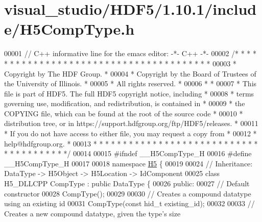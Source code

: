 \hypertarget{visual__studio_2_h_d_f5_21_810_81_2include_2_h5_comp_type_8h_source}{}\section{visual\+\_\+studio/\+H\+D\+F5/1.10.1/include/\+H5\+Comp\+Type.h}
\label{visual__studio_2_h_d_f5_21_810_81_2include_2_h5_comp_type_8h_source}

\begin{DoxyCode}
00001 \textcolor{comment}{// C++ informative line for the emacs editor: -*- C++ -*-}
00002 \textcolor{comment}{/* * * * * * * * * * * * * * * * * * * * * * * * * * * * * * * * * * * * * * *}
00003 \textcolor{comment}{ * Copyright by The HDF Group.                                               *}
00004 \textcolor{comment}{ * Copyright by the Board of Trustees of the University of Illinois.         *}
00005 \textcolor{comment}{ * All rights reserved.                                                      *}
00006 \textcolor{comment}{ *                                                                           *}
00007 \textcolor{comment}{ * This file is part of HDF5.  The full HDF5 copyright notice, including     *}
00008 \textcolor{comment}{ * terms governing use, modification, and redistribution, is contained in    *}
00009 \textcolor{comment}{ * the COPYING file, which can be found at the root of the source code       *}
00010 \textcolor{comment}{ * distribution tree, or in https://support.hdfgroup.org/ftp/HDF5/releases.  *}
00011 \textcolor{comment}{ * If you do not have access to either file, you may request a copy from     *}
00012 \textcolor{comment}{ * help@hdfgroup.org.                                                        *}
00013 \textcolor{comment}{ * * * * * * * * * * * * * * * * * * * * * * * * * * * * * * * * * * * * * * */}
00014 
00015 \textcolor{preprocessor}{#ifndef \_\_H5CompType\_H}
00016 \textcolor{preprocessor}{#define \_\_H5CompType\_H}
00017 
00018 \textcolor{keyword}{namespace }\hyperlink{namespace_h5}{H5} \{
00019 
00024 \textcolor{comment}{//  Inheritance: DataType -> H5Object -> H5Location -> IdComponent}
00025 \textcolor{keyword}{class }H5\_DLLCPP CompType : \textcolor{keyword}{public} DataType \{
00026    \textcolor{keyword}{public}:
00027         \textcolor{comment}{// Default constructor}
00028         CompType();
00029 
00030         \textcolor{comment}{// Creates a compound datatype using an existing id}
00031         CompType(\textcolor{keyword}{const} hid\_t existing\_id);
00032 
00033         \textcolor{comment}{// Creates a new compound datatype, given the type's size}

\end{DoxyCode}
